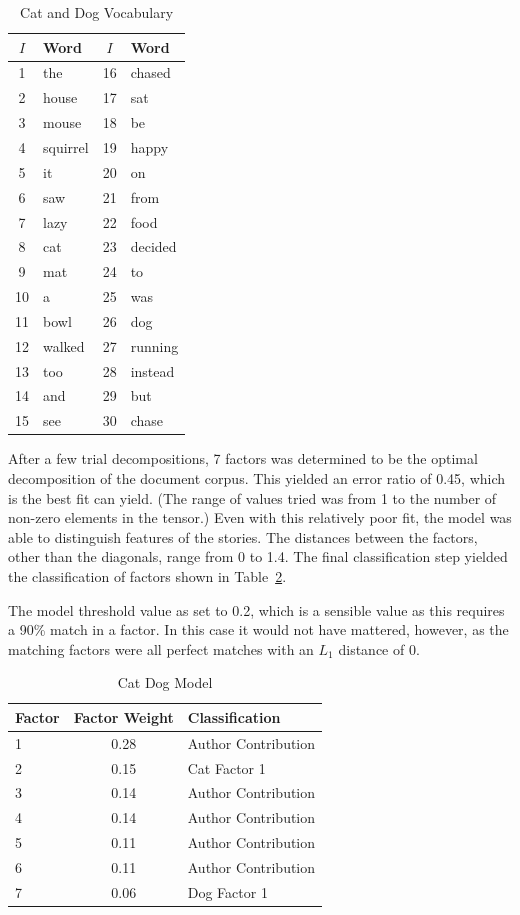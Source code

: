 \documentclass[../ut-dissertation.tex]{subfiles}
\begin{document}
\begin{table}
  \centering
  \begin{tabular}{c|l||c|l}
    $I$ & Word & $I$ & Word\\ 
    \hline
    1 & the & 16 & chased \\
    2 & house & 17 & sat \\
    3 & mouse & 18 & be \\
    4 & squirrel & 19 & happy \\
    5 & it & 20 & on\\
    6 & saw & 21 & from \\
    7 & lazy & 22 & food \\
    8 & cat & 23 & decided \\
    9 & mat & 24 & to\\
   10 & a & 25 & was \\
   11 & bowl & 26 & dog \\
   12 & walked & 27 & running \\
   13 & too & 28 & instead \\
   14 & and & 29 & but \\
   15 & see & 30 & chase\\
  \end{tabular}
  \caption{Cat and Dog Vocabulary}\label{tab:catdog_vocabulary}
\end{table}

After a few trial decompositions, 7 factors was determined to be the
optimal decomposition of the document corpus.  This yielded an error
ratio of 0.45, which is the best fit can yield.  (The range of values
tried was from 1 to the number of non-zero elements in the tensor.)
Even with this relatively poor fit, the model was able to distinguish
features of the stories.  The distances between the factors, other
than the diagonals, range from 0 to 1.4.  The final classification
step yielded the classification of factors shown in
Table~\ref{tab:cat_dog_class}.

The model threshold value as set to 0.2, which is a sensible value as
this requires a 90\% match in a factor.  In this case it would not
have mattered, however, as the matching factors were all perfect
matches with an $L_1$ distance of 0.

\begin{table}
  \centering
  \begin{tabular}{|l|c|l|}
    \hline
    Factor & Factor Weight & Classification\\
    \hline
    1 & 0.28 & Author Contribution\\
    \hline
    2 & 0.15 & Cat Factor 1\\
    \hline
    3 & 0.14 & Author Contribution\\
    \hline
    4 & 0.14 & Author Contribution\\
    \hline
    5 & 0.11 & Author Contribution\\
    \hline
    6 & 0.11 & Author Contribution\\
    \hline
    7 & 0.06 & Dog Factor 1\\
    \hline
  \end{tabular}
  \caption{Cat Dog Model} \label{tab:cat_dog_class}
\end{table}
\end{document}

